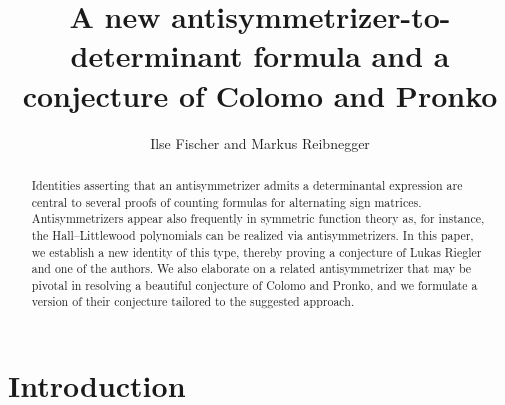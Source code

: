\documentclass[12pt,dvipsnames]{amsart}
\title[]{A new antisymmetrizer-to-determinant formula and a conjecture of Colomo and Pronko}
\author{Ilse Fischer and Markus Reibnegger}
\theoremstyle{definition}
\begin{document}
\begin{abstract}
Identities asserting that an antisymmetrizer admits a determinantal expression are central to several proofs of counting formulas for alternating sign matrices. Antisymmetrizers appear also frequently in symmetric function theory as, for instance, the Hall–Littlewood polynomials can be realized via antisymmetrizers. In this paper, we establish a new identity of this type, thereby proving a conjecture of Lukas Riegler and one of the authors. We also elaborate on a related antisymmetrizer that may be pivotal in resolving a beautiful conjecture of Colomo and Pronko, and we formulate a version of their conjecture tailored to the suggested approach.
\end{abstract}

\maketitle

\section{Introduction} 
\end{document}
